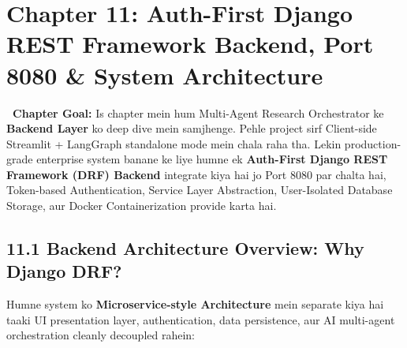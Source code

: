 \documentclass[12pt, a4paper]{article}
\begin{document}



\clearpage
\section{Chapter 11: Auth-First Django REST Framework Backend, Port 8080 \& System Architecture}

\begin{notebox}
\textbf{\faRocket\ Chapter Goal:} Is chapter mein hum Multi-Agent Research Orchestrator ke \textbf{Backend Layer} ko deep dive mein samjhenge. Pehle project sirf Client-side Streamlit + LangGraph standalone mode mein chala raha tha. Lekin production-grade enterprise system banane ke liye humne ek \textbf{Auth-First Django REST Framework (DRF) Backend} integrate kiya hai jo Port 8080 par chalta hai, Token-based Authentication, Service Layer Abstraction, User-Isolated Database Storage, aur Docker Containerization provide karta hai.
\end{notebox}

\subsection{11.1 Backend Architecture Overview: Why Django DRF?}

Humne system ko \textbf{Microservice-style Architecture} mein separate kiya hai taaki UI presentation layer, authentication, data persistence, aur AI multi-agent orchestration cleanly decoupled rahein:
\end{document}
